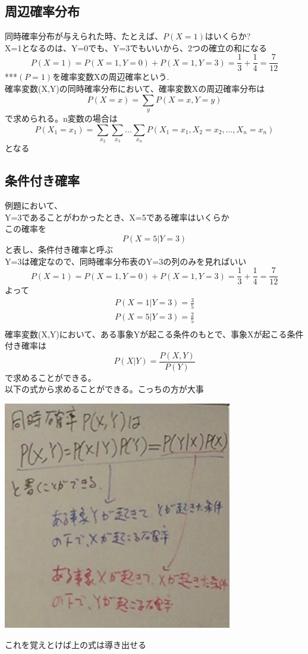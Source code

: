 \documentclass{jsarticle}
\begin{document}
\subsection{周辺確率分布}
	同時確率分布が与えられた時、たとえば、$P(X=1)$はいくらか?\\
	X=1となるのは、Y=0でも、Y=3でもいいから、2つの確立の和になる\\
	\[
		P(X=1)=P(X=1,Y=0)+P(X=1,Y=3)=\frac{1}{3}+\frac{1}{4}=\frac{7}{12}
	\]
	***$(P=1)$を確率変数Xの周辺確率という.\\
	確率変数(X,Y)の同時確率分布において、確率変数Xの周辺確率分布は
	\[
		P(X=x)=\sum_y P(X=x,Y=y)
	\]
	で求められる。n変数の場合は
	\[
		P(X_1=x_1)=\sum_{x_2}\sum_{x_3}...\sum_{x_n}P(X_1=x_1,X_2=x_2,...,X_n=x_n)
	\]
	となる
\subsection{条件付き確率}
	例題において、\\
	Y=3であることがわかったとき、X=5である確率はいくらか\\
	この確率を
	\[
		P(X=5|Y=3)
	\]
	と表し、条件付き確率と呼ぶ\\
	Y=3は確定なので、同時確率分布表のY=3の列のみを見ればいい\\
	
	\[
		P(X=1)=P(X=1,Y=0)+P(X=1,Y=3)=\frac{1}{3}+\frac{1}{4}=\frac{7}{12}
	\]
	よって
	\begin{eqnarray}
		P(X=1|Y=3)=\frac{3}{5}\\
		P(X=5|Y=3)=\frac{2}{5}\\
	\end{eqnarray}
	確率変数(X,Y)において、ある事象Yが起こる条件のもとで、事象Xが起こる条件付き確率は
	\[
		P(X|Y)=\frac{P(X,Y)}{P(Y)}
	\]
	で求めることができる。\\
	以下の式から求めることができる。こっちの方が大事\\
	\begin{center}
		\includegraphics[width=10cm]{11_30_4.JPG}
	\end{center}
	これを覚えとけば上の式は導き出せる\\
\end{document}
